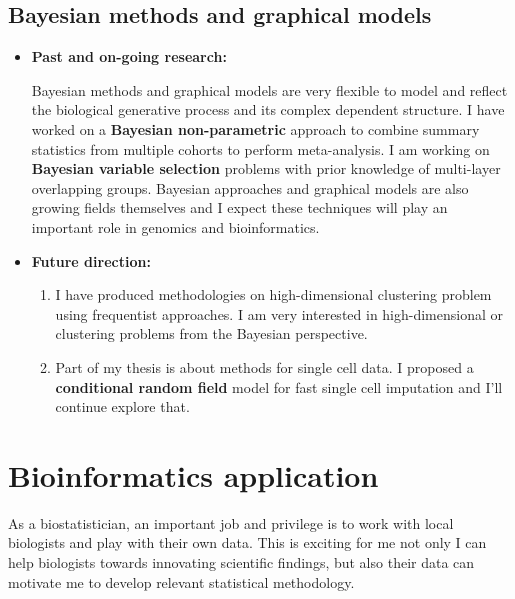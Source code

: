 \documentclass[a4paper, 10pt]{article}
\begin{document}
\subsection{Bayesian methods and graphical models}
\begin{itemize}
\item \textbf{Past and on-going research:}

Bayesian methods and graphical models are very flexible to model and reflect the biological generative process and its complex dependent structure.
I have worked on a \textbf{Bayesian non-parametric} approach to combine summary statistics from multiple cohorts to perform meta-analysis\cite{ref:BayesMP}.
I am working on \textbf{Bayesian variable selection} problems\cite{ref:MOG} with prior knowledge of multi-layer overlapping groups.
Bayesian approaches and graphical models are also growing fields themselves and I expect these techniques will play an important role in genomics and bioinformatics.

\item \textbf{Future direction:}
\begin{enumerate}
\item I have produced methodologies on high-dimensional clustering problem using frequentist approaches.
I am very interested in high-dimensional or clustering problems from the Bayesian perspective.
\item Part of my thesis is about methods for single cell data.
I proposed a \textbf{conditional random field} model for fast single cell imputation
and I'll continue explore that.

\end{enumerate}

\end{itemize}


\section{Bioinformatics application}
As a biostatistician,
an important job and privilege is to work with local biologists and play with their own data.
This is exciting for me not only I can help biologists towards innovating scientific findings,
but also their data can motivate me to develop relevant statistical methodology.
\end{document}

